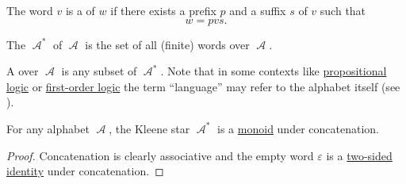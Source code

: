 \begin{definition}
\begin{thmenum}
     The word \( v \) is a  of \( w \) if there exists a prefix \( p \) and a suffix \( s \) of \( v \) such that
    \begin{equation*}
      w = pvs.
    \end{equation*}

     The  \( \mscrA^{\ast} \) of \( \mscrA \) is the set of all (finite) words over \( \mscrA \).

     A  over \( \mscrA \) is any subset of \( \mscrA^{\ast} \). Note that in some contexts like \hyperref[subsec:propositional_logic]{propositional logic} or \hyperref[subsec:first_order_logic]{first-order logic} the term \enquote{language} may refer to the alphabet itself (see ).
  \end{thmenum}
\end{definition}

\begin{proposition}\label{thm:kleene_star_is_monoid}
  For any alphabet \( \mscrA \), the Kleene star \( \mscrA^{\ast} \) is a \hyperref[def:unital_magma/associative]{monoid} under concatenation.
\end{proposition}
\begin{proof}
  Concatenation is clearly associative and the empty word \( \varepsilon \) is a \hyperref[def:magma_identity]{two-sided identity} under concatenation.
\end{proof}

